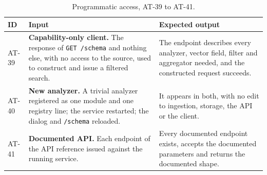 \documentclass[11pt,a4paper]{article}
\begin{document}
\begin{table}[htbp]
\centering
\scriptsize
\begin{tabularx}{\textwidth}{@{}L{0.85cm}XX@{}}
\toprule
\textbf{ID} & \textbf{Input} & \textbf{Expected output} \\
\midrule
AT-39 & \textbf{Capability-only client.} The response of \texttt{GET /schema} and nothing
else, with no access to the source, used to construct and issue a filtered search. &
The endpoint describes every analyzer, vector field, filter and aggregator needed, and the
constructed request succeeds. \\
AT-40 & \textbf{New analyzer.} A trivial analyzer registered as one module and one registry
line; the service restarted; the dialog and \texttt{/schema} reloaded. &
It appears in both, with no edit to ingestion, storage, the API or the client. \\
AT-41 & \textbf{Documented API.} Each endpoint of the API reference issued against the
running service. &
Every documented endpoint exists, accepts the documented parameters and returns the
documented shape. \\
\bottomrule
\end{tabularx}
\caption{Programmatic access, AT-39 to AT-41.}
\end{table}
\end{document}
